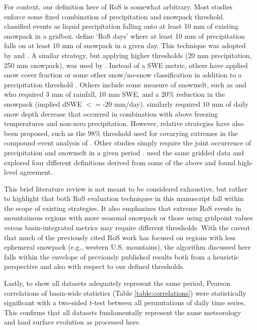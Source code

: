 \documentclass[nhess, manuscript]{copernicus}
\begin{document}
For context, our definition here of RoS is somewhat arbitrary. Most studies enforce some fixed combination of precipitation and snowpack threshold. \citet{ye2008winter} classified events as liquid precipitation falling onto at least 10 mm of existing snowpack in a gridbox. \citet{musselman2018projected} define `RoS days' where at least 10 mm of precipitation falls on at least 10 mm of snowpack in a given day. This technique was adopted by \citet{lopez2021changes} and \citet{maina2023diverging}. A similar strategy, but applying higher thresholds (20 mm precipitation, 250 mm snowpack), was used by \citet{wurzer2016influence}. Instead of a SWE metric, others have applied snow cover fraction or some other snow/no-snow classification in addition to a precipitation threshold \citep{mazurkiewicz2008assessing,pradhanang2013rain,cohen2015trends}. Others include some measure of snowmelt, such as \citet{freudiger2014large} and \citet{li2019the} who required 3 mm of rainfall, 10 mm SWE, and a 20\% reduction in the snowpack (implied dSWE $<=$-20 mm/day). \citet{suriano2022north} similarly required 10 mm of daily snow depth decrease that occurred in combination with above freezing temperatures and non-zero precipitation. However, relative strategies have also been proposed, such as the 98\% threshold used for covarying extremes in the compound event analysis of \citet{poschlod2020climate}. Other studies simply require the joint occurrence of precipitation and snowmelt in a given period \citep{mccabe2007rain,surfleet2013variability,collins2014annual,guan2016hydrometeorological,jeong2018rain}. \citet{wachowicz2020rain} used the same gridded data and explored four different definitions derived from some of the above and found high-level agreement.

This brief literature review is not meant to be considered exhaustive, but rather to highlight that both RoS evaluation techniques in this manuscript fall within the scope of existing strategies. It also emphasizes that extreme RoS events in mountainous regions with more seasonal snowpack or those using gridpoint values versus basin-integrated metrics may require different thresholds. With the caveat that much of the previously cited RoS work has focused on regions with less ephemeral snowpack (e.g., western U.S. mountains), the algorithm discussed here falls within the envelope of previously published results both from a heuristic perspective and also with respect to our defined thresholds.

Lastly, to show all datasets adequately represent the same period, Pearson correlations of basin-wide statistics (Table \ref{table:correlations}) were statistically significant with a two-sided $t$-test between all permutations of daily time series. This confirms that all datasets fundamentally represent the same meteorology and land surface evolution as processed here.
\end{document}
